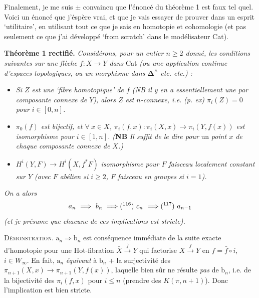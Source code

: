 \documentclass[11pt]{article}
\newcommand{\msp}[1]{\marginpar{\footnotesize [#1]}}
\begin{document}
Finalement, je me suis $\pm$ convaincu que l'énoncé du théorème 1 est faux tel quel. Voici un énoncé que j'éspère vrai, et que je vais essayer de prouver dans un esprit `utilitaire', en utilisant tout ce que je sais en homotopie et cohomologie (et pas seulement ce que j'ai développé `from scratch' dans le modélisateur Cat). %

\textbf{Théorème 1 rectifié.} \textit{Considérons, pour un entier $n \geq 2$ donné, les conditions suivantes sur une flèche $f : X \longrightarrow Y$ dans} Cat \textit{(ou une application continue d'espaces topologiques, ou un morphisme dans $\mathbf{\Delta}^\wedge$ etc. etc.) :}

\begin{itemize}
\item[$a_n$)] \textit{Si $Z$ est une `fibre homotopique' de $f$ (NB il y en a essentiellement une par composante connexe de $Y$), alors $Z$ est $n$-connexe, i.e.}
\msp{page 179}
\textit{(p. ex) $\pi_i(Z) = 0$ pour $i \in [0,n]$.}

\item[$b_n$)] \textit{$\pi_0(f)$ est bijectif, et $\forall\ x \in X$, $\pi_i(f,x) : \pi_i(X,x) \longrightarrow \pi_i(Y,f(x))$ est} \textit{isomorphisme pour $i \in [1,n]$. (}\textbf{NB} \textit{Il suffit de le dire pour} \textup{un} \textit{point $x$ de chaque composante connexe de $X$.)}

\item[$c_n$)] $H^i(Y,F) \longrightarrow H^i(X,f^*F)$ \textit{isomorphisme pour $F$ faisceau localement constant sur $Y$ (avec $F$ abélien si $i \geq 2$, $F$ faisceau en groupes si $i = 1$).}
\end{itemize}

\textit{On a alors}
\[
a_n \ \Longrightarrow\ b_n \ \Longrightarrow \text{(\footnotemark[116])}\ c_n \ \Longrightarrow \text{(\footnotemark[117])}\ a_{n-1}
\]
%
%
\textit{(et je présume que chacune de ces implications est stricte).}

\textsc{Démonstration}. $\mathrm{a}_n \Longrightarrow \mathrm{b}_n$ est conséquence immédiate de la suite exacte d'homotopie pour une Hot-fibration $\bar{X} \xrightarrow{\bar{f}} Y$ qui factorise $X \xrightarrow{f} Y$ en $f = \bar{f} \circ i$, $i \in W_\infty$. En fait, $\mathrm{a}_n$ \textit{équivaut} à $\mathrm{b}_n$ + la surjectivité des $\pi_{n+1}(X,x) \longrightarrow \pi_{n+1}(Y,f(x))$, laquelle bien sûr ne résulte \textit{pas} de $\mathrm{b}_n$, i.e. de la bijectivité des $\pi_i(f,x)$ pour $i \leq n$ (prendre des $K(\pi,n+1)$). Donc l'implication est bien stricte.
\end{document}
